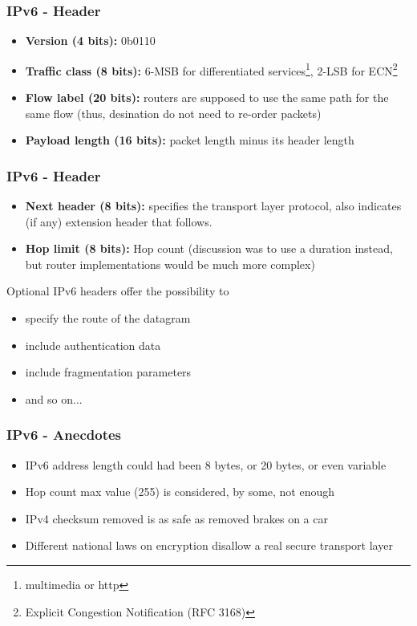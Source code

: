   \begin{frame}
    \frametitle{IPv6 - Header}
    \begin{itemize}
      \item \textbf{Version (4 bits):} 0b0110
      \item \textbf{Traffic class (8 bits):} 6-MSB for differentiated services\footnote{multimedia or http}, 2-LSB for ECN\footnote{Explicit Congestion Notification (RFC 3168)}
      \item \textbf{Flow label (20 bits):} routers are supposed to use the same path for the same flow (thus, desination do not need to re-order packets)
      \item \textbf{Payload length (16 bits):} packet length minus its header length
  \end{itemize}
  \end{frame}
    \begin{frame}
      \frametitle{IPv6 - Header}
      \begin{itemize}
          \item \textbf{Next header (8 bits):} specifies the transport layer protocol, also indicates (if any) extension header that follows.
          \item \textbf{Hop limit (8 bits):} Hop count (discussion was to use a duration instead, but router implementations would be much more complex)
    \end{itemize}
    \begin{block}{Optional IPv6 headers offer the possibility to}
        \begin{itemize}
            \item specify the route of the datagram
            \item include authentication data
            \item include fragmentation parameters
            \item and so on...
        \end{itemize}
    \end{block}
  \end{frame}
    \begin{frame}
      \frametitle{IPv6 - Anecdotes}
      \begin{itemize}
        \item IPv6 address length could had been 8 bytes, or 20 bytes, or even variable
        \item Hop count max value (255) is considered, by some, not enough
        \item IPv4 checksum removed is as safe as removed brakes on a car
        \item Different national laws on encryption disallow a real secure transport layer
    \end{itemize}
    \end{frame}

